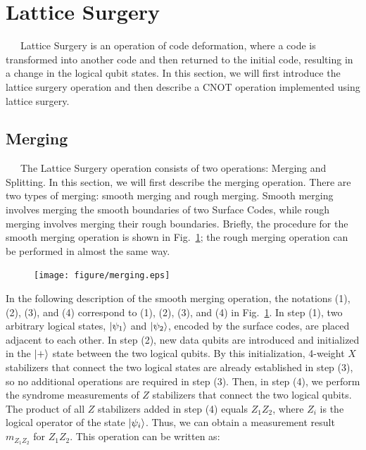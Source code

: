 \documentclass[a4paper,11pt]{ltjsarticle}
\begin{document}
\section{Lattice Surgery}\label{lattice_surgery}{
    \ \ \ Lattice Surgery \cite{horsman2012} is an operation of code deformation, where a code is transformed into another code and then returned to the initial code, resulting in a change in the logical qubit states. In this section, we will first introduce the lattice surgery operation and then describe a CNOT operation implemented using lattice surgery.

    \subsection{Merging}
    \ \ \ The Lattice Surgery operation consists of two operations: Merging and Splitting. In this section, we will first describe the merging operation. There are two types of merging: smooth merging and rough merging. Smooth merging involves merging the smooth boundaries of two Surface Codes, while rough merging involves merging their rough boundaries. Briefly, the procedure for the smooth merging operation is shown in Fig.~\ref{merging}; the rough merging operation can be performed in almost the same way.

    \begin{figure}[h]
        \centering
        \texttt{[image: figure/merging.eps]}
        \vspace{0pt}\caption{}
        \label{merging}
        \vspace{-10pt}
    \end{figure}

    In the following description of the smooth merging operation, the notations (1), (2), (3), and (4) correspond to (1), (2), (3), and (4) in Fig.~\ref{merging}. In step (1), two arbitrary logical states, $\ket{\psi_1}$ and $\ket{\psi_2}$, encoded by the surface codes, are placed adjacent to each other. In step (2), new data qubits are introduced and initialized in the $\ket{+}$ state between the two logical qubits. By this initialization, 4-weight $X$ stabilizers that connect the two logical states are already established in step (3), so no additional operations are required in step (3). Then, in step (4), we perform the syndrome measurements of $Z$ stabilizers that connect the two logical qubits. The product of all $Z$ stabilizers added in step (4) equals $Z_1Z_2$, where $Z_i$ is the logical operator of the state $\ket{\psi_i}$. Thus, we can obtain a measurement result $m_{Z_1Z_2}$ for $Z_1Z_2$. This operation can be written as:

}
\end{document}
